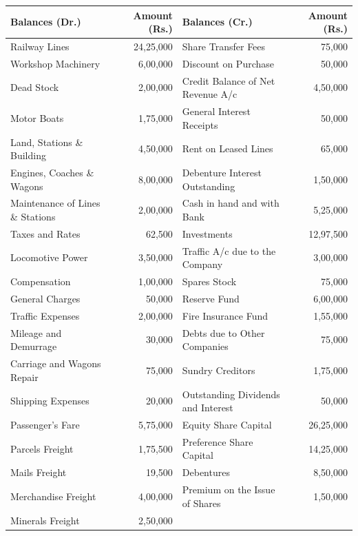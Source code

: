 \documentclass[11pt,a4paper]{article}
\begin{document}
\begin{center}
\renewcommand{\arraystretch}{1.2}
\small

\begin{tabular}{|l|r||l|r|}
\hline
   \textbf{Balances (Dr.)} &   \textbf{Amount (Rs.)} &   \textbf{Balances (Cr.)} &   \textbf{Amount (Rs.)} \\
\hline
Railway Lines & 24,25,000 & Share Transfer Fees & 75,000 \\
Workshop Machinery & 6,00,000 & Discount on Purchase & 50,000 \\
Dead Stock & 2,00,000 & Credit Balance of Net Revenue A/c & 4,50,000 \\
Motor Boats & 1,75,000 & General Interest Receipts & 50,000 \\
Land, Stations \& Building & 4,50,000 & Rent on Leased Lines & 65,000 \\
Engines, Coaches \& Wagons & 8,00,000 & Debenture Interest Outstanding & 1,50,000 \\
Maintenance of Lines \& Stations & 2,00,000 & Cash in hand and with Bank & 5,25,000 \\
Taxes and Rates & 62,500 & Investments & 12,97,500 \\
Locomotive Power & 3,50,000 & Traffic A/c due to the Company & 3,00,000 \\
Compensation & 1,00,000 & Spares Stock & 75,000 \\
General Charges & 50,000 & Reserve Fund & 6,00,000 \\
Traffic Expenses & 2,00,000 & Fire Insurance Fund & 1,55,000 \\
Mileage and Demurrage & 30,000 & Debts due to Other Companies & 75,000 \\
Carriage and Wagons Repair & 75,000 & Sundry Creditors & 1,75,000 \\
Shipping Expenses & 20,000 & Outstanding Dividends and Interest & 50,000 \\
Passenger's Fare & 5,75,000 & Equity Share Capital & 26,25,000 \\
Parcels Freight & 1,75,500 & Preference Share Capital & 14,25,000 \\
Mails Freight & 19,500 & Debentures & 8,50,000 \\
Merchandise Freight & 4,00,000 & Premium on the Issue of Shares & 1,50,000 \\
Minerals Freight & 2,50,000 & & \\
\hline
\end{tabular}
\end{center}
\end{document}
